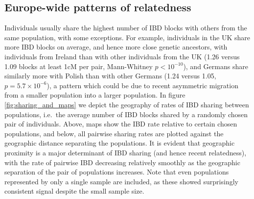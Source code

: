 \documentclass{article}
\begin{document}
\subsection{Europe-wide patterns of relatedness}

Individuals usually share the highest number of IBD blocks with others from the same population,
with some exceptions. 
For example, individuals in the UK share more IBD blocks on average, 
and hence more close genetic ancestors,
with individuals from Ireland than with other individuals from the UK (1.26 versus 1.09 blocks at least 1cM per pair, Mann-Whitney $p<10^{-10}$),
and Germans share similarly more with Polish than with other Germans (1.24 versus 1.05, $p=5.7\times10^{-6}$),
a pattern which could be due to recent asymmetric migration from a
smaller population into a larger population. 
In figure \ref{fig:sharing_and_maps} we depict the geography of rates of IBD sharing between populations,  
i.e.\ the average number of IBD blocks shared by a randomly chosen pair of individuals.
Above, maps show the IBD rate relative to certain chosen populations,
and below, all pairwise sharing rates are plotted against the geographic distance separating the populations.
It is evident that geographic proximity is a major determinant of IBD sharing (and hence recent relatedness), 
with the rate of pairwise IBD decreasing relatively smoothly as the
geographic separation of the pair of populations increases. 
Note that even populations represented by only a single sample are included,
as these showed surprisingly consistent signal despite the small sample size.
\end{document}
